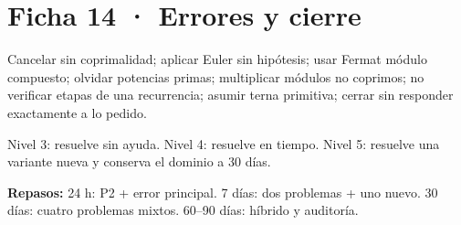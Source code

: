 \documentclass[10pt,a4paper,openany]{report}
\begin{document}
\section*{Ficha 14 · Errores y cierre}
\begin{alerta}
Cancelar sin coprimalidad; aplicar Euler sin hipótesis; usar Fermat módulo compuesto; olvidar potencias primas; multiplicar módulos no coprimos; no verificar etapas de una recurrencia; asumir terna primitiva; cerrar sin responder exactamente a lo pedido.
\end{alerta}
\begin{ruta}
Nivel 3: resuelve sin ayuda. Nivel 4: resuelve en tiempo. Nivel 5: resuelve una variante nueva y conserva el dominio a 30 días.
\end{ruta}
\textbf{Repasos:} 24 h: P2 + error principal. 7 días: dos problemas + uno nuevo. 30 días: cuatro problemas mixtos. 60--90 días: híbrido y auditoría.
\end{document}
